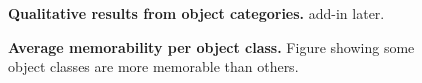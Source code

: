 \begin{figure}[t]
\centering
{}
\vspace{-5mm}\caption{\footnotesize\textbf{Qualitative results from object categories.} add-in later. }\label{fig:obLabelQual}
\end{figure}

%
\begin{figure}[t]
\centering
{}
\vspace{-5mm}\caption{\footnotesize\textbf{Average memorability per object class.} Figure showing some object classes are more memorable than others. }\label{fig:avgMem}
\end{figure}
